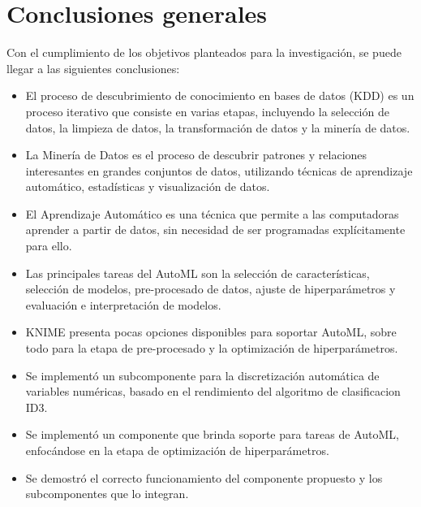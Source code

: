 \chapter*{Conclusiones generales}
Con el cumplimiento de los objetivos planteados para la investigación, se puede llegar a las siguientes conclusiones:
\begin{itemize}
	\item El proceso de descubrimiento de conocimiento en bases de datos (KDD) es un proceso iterativo que consiste en varias etapas, incluyendo la selección de datos, la limpieza de datos, la transformación de datos y la minería de datos.
	\item La Minería de Datos es el proceso de descubrir patrones y relaciones interesantes en grandes conjuntos de datos, utilizando técnicas de aprendizaje automático, estadísticas y visualización de datos.
	\item El Aprendizaje Automático es una técnica que permite a las computadoras aprender a partir de datos, sin necesidad de ser programadas explícitamente para ello.
	\item Las principales tareas del AutoML son la selección de características, selección de modelos, pre-procesado de datos, ajuste de hiperparámetros y evaluación e interpretación de modelos.
	\item KNIME presenta pocas opciones disponibles para soportar AutoML, sobre todo para la etapa de pre-procesado y la optimización de hiperparámetros.
	\item Se implementó un subcomponente para la discretización automática de variables numéricas, basado en el rendimiento del algoritmo de clasificacion ID3.
	\item Se implementó un componente que brinda soporte para tareas de AutoML, enfocándose en la etapa de optimización de hiperparámetros.
	\item Se demostró el correcto funcionamiento del componente propuesto y los subcomponentes que lo integran.
\end{itemize}